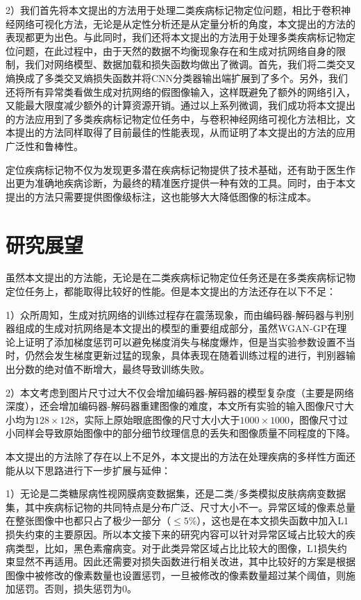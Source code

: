 2）我们首先将本文提出的方法用于处理二类疾病标记物定位问题，相比于卷积神经网络可视化方法，无论是从定性分析还是从定量分析的角度，本文提出的方法的表现都更为出色。与此同时，我们还将本文提出的方法用于处理多类疾病标记物定位问题，在此过程中，由于天然的数据不均衡现象存在和生成对抗网络自身的限制，我们对网络模型、数据加载和损失函数均做出了微调。首先，我们将二类交叉熵换成了多类交叉熵损失函数并将CNN分类器输出端扩展到了多个。另外，我们还将所有异常类看做生成对抗网络的假图像输入，这样既避免了额外的网络引入，又能最大限度减少额外的计算资源开销。通过以上系列微调，我们成功将本文提出的方法应用到了多类疾病标记物定位任务中，与卷积神经网络可视化方法相比，文本提出的方法同样取得了目前最佳的性能表现，从而证明了本文提出的方法的应用广泛性和鲁棒性。

定位疾病标记物不仅为发现更多潜在疾病标记物提供了技术基础，还有助于医生作出更为准确地疾病诊断，为最终的精准医疗提供一种有效的工具。同时，由于本文提出的方法只需要提供图像级标注，这也能够大大降低图像的标注成本。

\section{研究展望}
虽然本文提出的方法能，无论是在二类疾病标记物定位任务还是在多类疾病标记物定位任务上，都能取得比较好的性能。但是本文提出的方法还存在以下不足：

1）众所周知，生成对抗网络的训练过程存在震荡现象，而由编码器-解码器与判别器组成的生成对抗网络是本文提出的模型的重要组成部分，虽然WGAN-GP在理论上证明了添加梯度惩罚可以避免梯度消失与梯度爆炸，但是当实验参数设置不当时，仍然会发生梯度更新过猛的现象，具体表现在随着训练过程的进行，判别器输出分数的绝对值不断增大，最终导致训练失败。

2）本文考虑到图片尺寸过大不仅会增加编码器-解码器的模型复杂度（主要是网络深度），还会增加编码器-解码器重建图像的难度，本文所有实验的输入图像尺寸大小均为$128\times 128$，实际上原始眼底图像的尺寸大小大于$1000\times 1000$，图像尺寸过小同样会导致原始图像中的部分细节纹理信息的丢失和图像质量不同程度的下降。

本文提出的方法除了存在以上不足外，本文提出的方法在处理疾病的多样性方面还能从以下思路进行下一步扩展与延伸：

1）无论是二类糖尿病性视网膜病变数据集，还是二类/多类模拟皮肤病病变数据集，其中疾病标记物的共同特点是分布广泛、尺寸大小不一。异常区域的像素总量在整张图像中也都只占了极少一部分（$\le 5\%$），这也是在本文损失函数中加入L1损失约束的主要原因。所以本文接下来的研究内容可以针对异常区域占比较大的疾病类型，比如，黑色素瘤病变。对于此类异常区域占比比较大的图像，L1损失约束显然不再适用。因此还需要对损失函数进行相关改进，其中比较好的方案是根据图像中被修改的像素数量也设置惩罚，一旦被修改的像素数量超过某个阈值，则施加惩罚。否则，损失惩罚为$0$。

